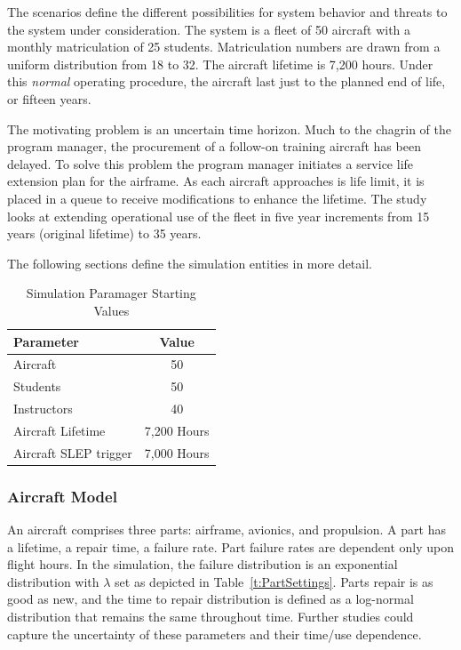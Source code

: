 \documentclass[preprint,12pt]{elsarticle}
\begin{document}
The scenarios define the different possibilities for system behavior
and threats to the system under consideration. The system is a fleet
of 50 aircraft with a monthly matriculation of
25 students. Matriculation numbers are drawn from a uniform
distribution from 18 to 32.  The aircraft lifetime is 7,200 hours. Under this
\emph{normal} operating procedure, the  
aircraft last just to the planned end of life, or fifteen years.

The motivating problem is an uncertain time horizon. Much to the
chagrin of the program manager, the procurement of a follow-on
training aircraft has been delayed. To solve this problem the program manager
initiates a service life extension plan for the airframe. As each
aircraft approaches is life limit, it is placed in a queue to receive
modifications to enhance the lifetime. The study looks at extending
operational use of the fleet in five year increments from 15 years
(original lifetime) to 35 years.

The following sections define the simulation entities in more detail.

\begin{table}[h]
\begin{center}
    \caption{Simulation Paramager Starting Values }
  \label{t:StartingValues}
    \begin{tabular}{l c }
      \hline
      \hline
      \textbf{Parameter} & \textbf{Value} \\
      \hline
      Aircraft & 50 \\
      Students & 50 \\
      Instructors & 40 \\
      Aircraft Lifetime & 7,200 Hours \\
      Aircraft SLEP trigger & 7,000 Hours \\
      \hline
    \end{tabular}
    \end{center}
\end{table}

\subsubsection{Aircraft Model}
An aircraft comprises three parts: airframe, avionics, and
propulsion. A part has a lifetime, a repair time, a failure rate. Part
failure rates are dependent only upon flight hours. In the simulation,
the failure distribution is an exponential distribution with $\lambda$
set as depicted in Table~\ref{t:PartSettings}. Parts repair is
as good as new, and the time to repair distribution is defined as a
log-normal distribution that remains the same throughout time. Further
studies could capture the uncertainty of these parameters and their
time/use dependence. 
\end{document}
